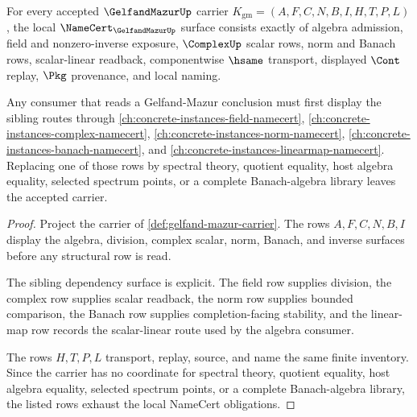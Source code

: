 \begin{theorem}
\label{thm:gelfand-mazur-namecert-obligations}
For every accepted $\GelfandMazurUp$ carrier $K_{\mathrm{gm}}=(A,F,C,N,B,I,H,T,P,L)$, the local $\NameCert_{\GelfandMazurUp}$ surface consists exactly of algebra admission, field and nonzero-inverse exposure, $\ComplexUp$ scalar rows, norm and Banach rows, scalar-linear readback, componentwise $\hsame$ transport, displayed $\Cont$ replay, $\Pkg$ provenance, and local naming.

Any consumer that reads a Gelfand-Mazur conclusion must first display the sibling routes through \autoref{ch:concrete-instances-field-namecert}, \autoref{ch:concrete-instances-complex-namecert}, \autoref{ch:concrete-instances-norm-namecert}, \autoref{ch:concrete-instances-banach-namecert}, and \autoref{ch:concrete-instances-linearmap-namecert}. Replacing one of those rows by spectral theory, quotient equality, host algebra equality, selected spectrum points, or a complete Banach-algebra library leaves the accepted carrier.
\end{theorem}
\begin{proof}
Project the carrier of \autoref{def:gelfand-mazur-carrier}. The rows $A,F,C,N,B,I$ display the algebra, division, complex scalar, norm, Banach, and inverse surfaces before any structural row is read.

The sibling dependency surface is explicit. The field row supplies division, the complex row supplies scalar readback, the norm row supplies bounded comparison, the Banach row supplies completion-facing stability, and the linear-map row records the scalar-linear route used by the algebra consumer.

The rows $H,T,P,L$ transport, replay, source, and name the same finite inventory. Since the carrier has no coordinate for spectral theory, quotient equality, host algebra equality, selected spectrum points, or a complete Banach-algebra library, the listed rows exhaust the local NameCert obligations.
\end{proof}

